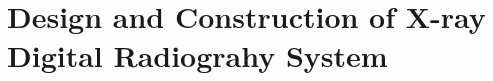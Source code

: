 \chapter{Design and Construction of X-ray Digital Radiograhy System}
\label{chap:DR_design_construct}